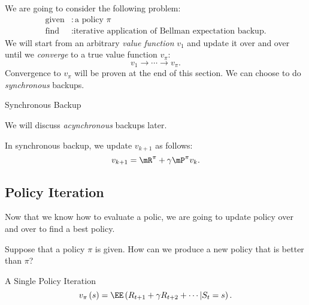 \documentclass[RL]{subfiles}
\begin{document}
    We are going to consider the following problem:
    \begin{equation}
        \begin{aligned}
            \text{given} & : \text{a policy $\pi$} \\
            \text{find} & : \text{iterative application of Bellman expectation backup.}
        \end{aligned} 
    \end{equation}
    We will start from an arbitrary \textit{value function} $v_1$ and update it over and over until we \textit{converge} to a true value function $v_{\pi}$:
    \begin{equation*}
        v_1 \to \cdots \to v_{\pi}.
    \end{equation*}
    Convergence to $v_\pi$ will be proven at the end of this section. We can choose to do \textit{synchronous} backups.

    \begin{algorithm}{Synchronous Backup}
    \end{algorithm}
        
    \np\noindent We will discuss \textit{acynchronous} backups later.

    \np In synchronous backup, we update $v_{k+1}$ as follows:
    \begin{equation}
        v_{k+1} = \mR^{\pi} + \gamma\mP^{\pi}v_k.
    \end{equation}

    \subsection{Policy Iteration}
    
    Now that we know how to evaluate a polic, we are going to update policy over and over to find a best policy.

    Suppose that a policy $\pi$ is given. How can we produce a new policy that is better than $\pi$?

    \begin{algorithm}{A Single Policy Iteration}
        \begin{equation}
            v_{\pi}\left( s \right) = \EE\left( R_{t+1}+\gamma R_{t+2}+\cdots | S_t=s \right).
        \end{equation}
    \end{algorithm}
    
\end{document}
